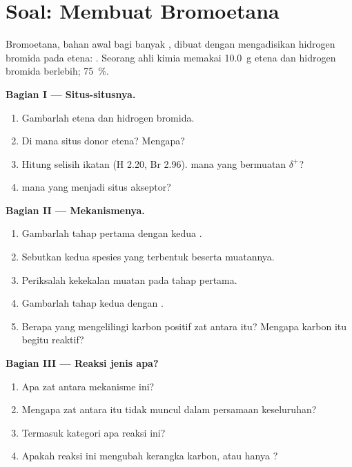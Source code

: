 \section{Soal: Membuat Bromoetana}

\begin{problem}
\label{pb:g12:curly-arrows:1}
Bromoetana, bahan awal bagi banyak , dibuat dengan
mengadisikan hidrogen bromida pada etena:
. Seorang ahli kimia memakai
\qty{10.0}{g} etena dan hidrogen bromida berlebih; 
\qty{75}{\percent}.

\medskip
\noindent\textbf{Bagian I --- Situs-situsnya.}
\begin{enumerate}
  \item Gambarlah  etena dan hidrogen bromida.
  \item Di mana situs donor etena? Mengapa?
  \item Hitung selisih  ikatan 
        (H 2.20, Br 2.96).  mana yang bermuatan $\delta^+$?
  \item {}  mana yang menjadi situs akseptor?
\end{enumerate}

\medskip
\noindent\textbf{Bagian II --- Mekanismenya.}
\begin{enumerate}[resume]
  \item Gambarlah tahap pertama dengan kedua .
  \item Sebutkan kedua spesies yang terbentuk beserta muatannya.
  \item Periksalah kekekalan muatan pada tahap pertama.
  \item Gambarlah tahap kedua dengan .
  \item Berapa  yang mengelilingi karbon positif zat antara itu?
        Mengapa karbon itu begitu reaktif?
\end{enumerate}

\medskip
\noindent\textbf{Bagian III --- Reaksi jenis apa?}
\begin{enumerate}[resume]
  \item Apa zat antara mekanisme ini?
  \item Mengapa zat antara itu tidak muncul dalam persamaan
        keseluruhan?
  \item Termasuk kategori apa reaksi ini?
  \item Apakah reaksi ini mengubah kerangka karbon, atau hanya ?
\end{enumerate}


\end{problem}
